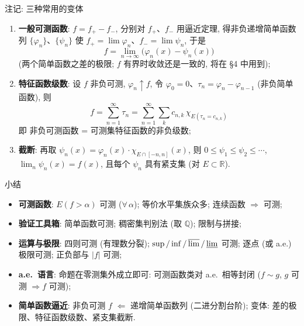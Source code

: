 
\begin{frame}{注记: 三种常用的变体}

\begin{enumerate}
\item \textbf{一般可测函数}: $f = f_+ - f_-$, 分别对 $f_+$、$f_-$ 用逼近定理, 得非负递增简单函数列 $\{\varphi_n\}$、$\{\psi_n\}$ 使 $f_+ = \lim \varphi_n$、$f_- = \lim \psi_n$, 于是
\[
f = \lim_{n \to \infty} \big(\varphi_n(x) - \psi_n(x)\big)
\]
(两个简单函数之差的极限; $f$ \alert{有界}时收敛还是一致的, 将在 \S 4 中用到);
\pause
\item \textbf{特征函数级数}: 设 $f$ 非负可测, $\varphi_n \uparrow f$, 令 $\varphi_0 = 0$、$\tau_n = \varphi_n - \varphi_{n-1}$ (非负简单函数), 则
\[
f = \sum_{n=1}^{\infty} \tau_n = \sum_{n=1}^{\infty} \sum_{k} c_{n,k}\, \chi_{E(\tau_n = c_{n,k})}
\]
即 \alert{非负可测函数 = 可测集特征函数的非负级数};
\pause
\item \textbf{截断}: 再取 $\psi_n(x) = \varphi_n(x) \cdot \chi_{E \cap [-n, n]}(x)$, 则 $0 \leqslant \psi_1 \leqslant \psi_2 \leqslant \cdots$, $\lim_n \psi_n(x) = f(x)$, 且每个 $\psi_n$ \alert{具有紧支集} (对 $E \subset \mathbb{R}$).
\end{enumerate}

\end{frame}




\begin{frame}{小结}

\begin{itemize}
\item \textbf{可测函数}: $E(f>\alpha)$ 可测 ($\forall\, \alpha$); 等价水平集族众多; 连续函数 $\Rightarrow$ 可测;
\pause
\item \textbf{验证工具箱}: 简单函数可测; 稠密集判别法 (取 $\mathbb{Q}$); 限制与拼接;
\pause
\item \textbf{运算与极限}: 四则可测 (有理数分裂); $\sup/\inf/\varlimsup/\varliminf$ 可测; 逐点 (或 a.e.) 极限可测; 正负部与 $|f|$ 可测;
\pause
\item \textbf{a.e.\ 语言}: 命题在零测集外成立即可: 可测函数类对 a.e.\ 相等封闭 ($f \sim g$, $g$ 可测 $\Rightarrow f$ 可测);
\pause
\item \textbf{简单函数逼近}: 非负可测 $f$ $\Longleftarrow$ 递增简单函数列 (二进分割台阶); 变体: 差的极限、特征函数级数、紧支集截断.
\end{itemize}

\end{frame}

